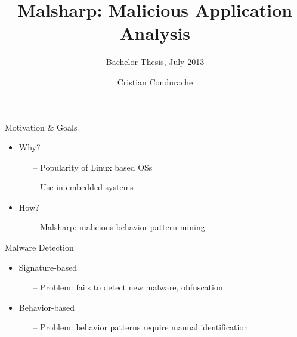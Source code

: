 \documentclass{beamer}
\title{Malsharp: Malicious Application Analysis}
\subtitle{Bachelor Thesis, July 2013}
\institute{\small{As.dr.ing. Laura Gheorghe}}
\author{\small{Cristian Condurache}}
\begin{document}
{
  \frame{\titlepage}
}

\begin{frame}{Motivation \& Goals}
  \begin{itemize}
    \item<1-> Why?
    \begin{itemize}
      \item[--] Popularity of Linux based OSs
      \item[--] Use in embedded systems
    \end{itemize}
    \item<2-> How?
    \begin{itemize}
      \item[--] Malsharp: malicious behavior pattern mining
    \end{itemize}
  \end{itemize}
\end{frame}

\begin{frame}{Malware Detection}
  \begin{itemize}
    \item Signature-based
    \begin{itemize}
      \item[--] Problem: fails to detect new malware, obfuscation
    \end{itemize}
    \item Behavior-based
    \begin{itemize}
      \item[--] Problem: behavior patterns require manual identification
    \end{itemize}
  \end{itemize}
\end{frame}
\end{document}
